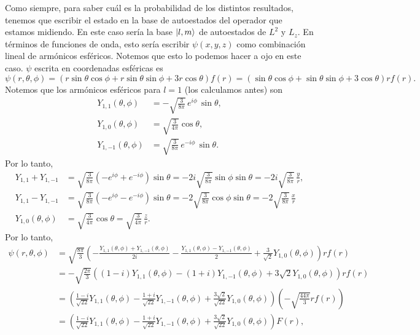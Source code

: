 \documentclass[10pt, a4paper]{article}
\newcommand{\Ylmev}[2]{Y_{#1,#2}}
\numberwithin{equation}{subsection}
\begin{document}

Como siempre, para saber cuál es la probabilidad de los distintos resultados,
tenemos que escribir el estado en la base de autoestados del operador que
estamos midiendo. En este caso sería la base $\ket{l,m}$ de autoestados de
$L^2$ y $L_z$. En términos de funciones de onda, esto sería escribir
$\psi(x,y,z)$ como combinación lineal de armónicos esféricos. Notemos que esto
lo podemos hacer a ojo en este caso. $\psi$ escrita en coordenadas esféricas es
\begin{equation}
  \psi(r,\theta,\phi) = \left(r\sin\theta\cos\phi + r\sin\theta\sin\phi +
    3r\cos\theta\right)f(r) =
  \left(\sin\theta\cos\phi + \sin\theta\sin\phi +
    3\cos\theta\right)rf(r).
\end{equation}
Notemos que los armónicos esféricos para $l=1$ (los calculamos antes) son
\begin{align}
  \Ylmev{1}{1}(\theta,\phi) &= -\sqrt{\frac{3}{8\pi}}\,e^{i\phi}\,\sin\theta, \\
  \Ylmev{1}{0}(\theta,\phi) &= \sqrt{\frac{3}{4\pi}}\cos\theta, \\
  \Ylmev{1}{-1}(\theta,\phi) &= \sqrt{\frac{3}{8\pi}}\,e^{-i\phi}\,\sin\theta.
\end{align}
Por lo tanto,
\begin{align}
  \Ylmev{1}{1} + \Ylmev{1}{-1} &=
    \sqrt{\frac{3}{8\pi}}\left(-e^{i\phi} + e^{-i\phi}\right)\sin\theta =
    -2i\sqrt{\frac{3}{8\pi}}\sin\phi\sin\theta =
    -2i\sqrt{\frac{3}{8\pi}}\,\frac{y}{r}, \\
  \Ylmev{1}{1} - \Ylmev{1}{-1} &=
    \sqrt{\frac{3}{8\pi}}\left(-e^{i\phi} - e^{-i\phi}\right)\sin\theta =
    -2\sqrt{\frac{3}{8\pi}}\cos\phi\sin\theta =
    -2\sqrt{\frac{3}{8\pi}}\,\frac{x}{r} \\
  \Ylmev{1}{0}(\theta,\phi) &= \sqrt{\frac{3}{4\pi}}\cos\theta =
    \sqrt{\frac{3}{4\pi}}\,\frac{z}{r}.
\end{align}
Por lo tanto,
\begin{align}
  \psi(r,\theta,\phi) &=
  \sqrt{\frac{8\pi}{3}}\left(-\frac{\Ylmev{1}{1}(\theta,\phi) +
    \Ylmev{1}{-1}(\theta,\phi)}{2i} - \frac{\Ylmev{1}{1}(\theta,\phi) -
    \Ylmev{1}{-1}(\theta,\phi)}{2} +
    \frac{3}{\sqrt{2}}\Ylmev{1}{0}(\theta,\phi)\right)rf(r) \\
  &= -\sqrt{\frac{2\pi}{3}}\left((1 - i)\Ylmev{1}{1}(\theta,\phi) -
    (1 + i)\Ylmev{1}{-1}(\theta,\phi) +
    3\sqrt{2}\Ylmev{1}{0}(\theta,\phi)\right)rf(r) \\
  &= \left(\frac{1 - i}{\sqrt{22}}\Ylmev{1}{1}(\theta,\phi) -
    \frac{1 + i}{\sqrt{22}}\Ylmev{1}{-1}(\theta,\phi) +
    \frac{3\sqrt{2}}{\sqrt{22}}\Ylmev{1}{0}(\theta,\phi)\right)
    \left(-\sqrt{\frac{44\pi}{3}}rf(r)\right) \\
  &= \left(\frac{1 - i}{\sqrt{22}}\Ylmev{1}{1}(\theta,\phi) -
    \frac{1 + i}{\sqrt{22}}\Ylmev{1}{-1}(\theta,\phi) +
    \frac{3\sqrt{2}}{\sqrt{22}}\Ylmev{1}{0}(\theta,\phi)\right)
    F(r),
\end{align}
\end{document}
